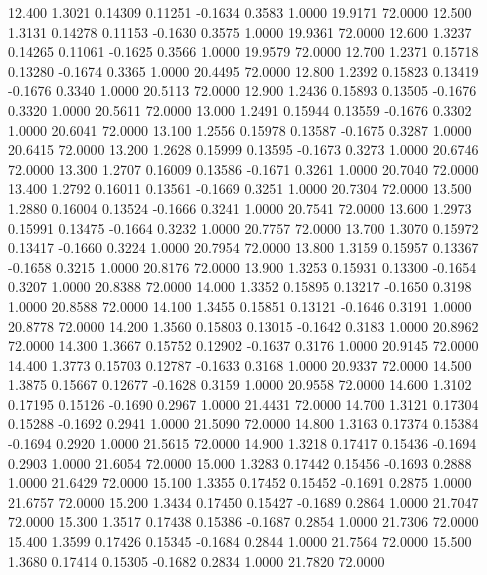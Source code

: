   12.400   1.3021   0.14309   0.11251  -0.1634   0.3583   1.0000  19.9171  72.0000
  12.500   1.3131   0.14278   0.11153  -0.1630   0.3575   1.0000  19.9361  72.0000
  12.600   1.3237   0.14265   0.11061  -0.1625   0.3566   1.0000  19.9579  72.0000
  12.700   1.2371   0.15718   0.13280  -0.1674   0.3365   1.0000  20.4495  72.0000
  12.800   1.2392   0.15823   0.13419  -0.1676   0.3340   1.0000  20.5113  72.0000
  12.900   1.2436   0.15893   0.13505  -0.1676   0.3320   1.0000  20.5611  72.0000
  13.000   1.2491   0.15944   0.13559  -0.1676   0.3302   1.0000  20.6041  72.0000
  13.100   1.2556   0.15978   0.13587  -0.1675   0.3287   1.0000  20.6415  72.0000
  13.200   1.2628   0.15999   0.13595  -0.1673   0.3273   1.0000  20.6746  72.0000
  13.300   1.2707   0.16009   0.13586  -0.1671   0.3261   1.0000  20.7040  72.0000
  13.400   1.2792   0.16011   0.13561  -0.1669   0.3251   1.0000  20.7304  72.0000
  13.500   1.2880   0.16004   0.13524  -0.1666   0.3241   1.0000  20.7541  72.0000
  13.600   1.2973   0.15991   0.13475  -0.1664   0.3232   1.0000  20.7757  72.0000
  13.700   1.3070   0.15972   0.13417  -0.1660   0.3224   1.0000  20.7954  72.0000
  13.800   1.3159   0.15957   0.13367  -0.1658   0.3215   1.0000  20.8176  72.0000
  13.900   1.3253   0.15931   0.13300  -0.1654   0.3207   1.0000  20.8388  72.0000
  14.000   1.3352   0.15895   0.13217  -0.1650   0.3198   1.0000  20.8588  72.0000
  14.100   1.3455   0.15851   0.13121  -0.1646   0.3191   1.0000  20.8778  72.0000
  14.200   1.3560   0.15803   0.13015  -0.1642   0.3183   1.0000  20.8962  72.0000
  14.300   1.3667   0.15752   0.12902  -0.1637   0.3176   1.0000  20.9145  72.0000
  14.400   1.3773   0.15703   0.12787  -0.1633   0.3168   1.0000  20.9337  72.0000
  14.500   1.3875   0.15667   0.12677  -0.1628   0.3159   1.0000  20.9558  72.0000
  14.600   1.3102   0.17195   0.15126  -0.1690   0.2967   1.0000  21.4431  72.0000
  14.700   1.3121   0.17304   0.15288  -0.1692   0.2941   1.0000  21.5090  72.0000
  14.800   1.3163   0.17374   0.15384  -0.1694   0.2920   1.0000  21.5615  72.0000
  14.900   1.3218   0.17417   0.15436  -0.1694   0.2903   1.0000  21.6054  72.0000
  15.000   1.3283   0.17442   0.15456  -0.1693   0.2888   1.0000  21.6429  72.0000
  15.100   1.3355   0.17452   0.15452  -0.1691   0.2875   1.0000  21.6757  72.0000
  15.200   1.3434   0.17450   0.15427  -0.1689   0.2864   1.0000  21.7047  72.0000
  15.300   1.3517   0.17438   0.15386  -0.1687   0.2854   1.0000  21.7306  72.0000
  15.400   1.3599   0.17426   0.15345  -0.1684   0.2844   1.0000  21.7564  72.0000
  15.500   1.3680   0.17414   0.15305  -0.1682   0.2834   1.0000  21.7820  72.0000
